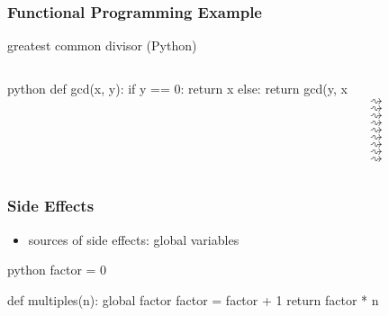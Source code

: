 \documentclass[dvipsnames]{beamer}
\theoremstyle{plain}
\begin{document}
\begin{frame}[fragile]
  \frametitle{Functional Programming Example}

  \begin{exampleblock}{greatest common divisor (Python)}
    \begin{columns}[t]
      \begin{pygments}{python}
def gcd(x, y):
    if y == 0:
        return x
    else:
        return gcd(y, x %
      \end{pygments}

      \\
      $\rightsquigarrow$ \\
      \hspace{16pt}$\rightsquigarrow$ \\
      \hspace{32pt}$\rightsquigarrow$ \\
      \hspace{48pt}$\rightsquigarrow$ \\
      \hspace{64pt}$\rightsquigarrow$ \\
      \hspace{48pt}$\rightsquigarrow$ \\
      \hspace{32pt}$\rightsquigarrow$ \\
      \hspace{16pt}$\rightsquigarrow$ \\
      $\rightsquigarrow$ \\
    \end{columns}
  \end{exampleblock}
\end{frame}

\begin{frame}[fragile]
  \frametitle{Side Effects}

  \begin{itemize}
    \item sources of side effects: global variables
  \end{itemize}

  \begin{exampleblock}{}
    \begin{pygments}{python}
factor = 0

def multiples(n):
    global factor
    factor = factor + 1
    return factor * n
      \end{pygments}
    \end{exampleblock}
\end{frame}
\end{document}
